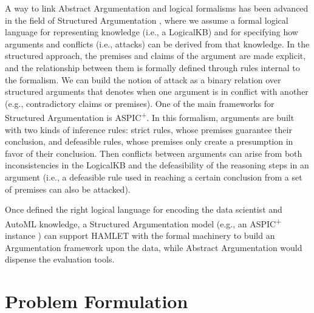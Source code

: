 A way to link Abstract Argumentation and logical formalisms has been advanced in the field of Structured Argumentation \cite{BesnardGHMPST14structured}, where we assume a formal logical language for representing knowledge (i.e., a LogicalKB) and for specifying how arguments and conflicts (i.e., attacks) can be derived from that knowledge. 
In the structured approach, the premises and claims of the argument are made explicit, and the relationship between them is formally defined through rules internal to the formalism.
We can build the notion of attack as a binary relation over structured arguments that denotes when one argument is in conflict with another (e.g., contradictory claims or premises).
One of the main frameworks for Structured Argumentation is ASPIC\textsuperscript{+}\cite{Modgil2014aspic+}.
In this formalism, arguments are built with two kinds of inference rules: strict rules, whose premises guarantee their conclusion, and defeasible rules, whose premises only create a presumption in favor of their conclusion.
Then conflicts between arguments can arise from both inconsistencies in the LogicalKB and the defeasibility of the reasoning steps in an argument (i.e., a defeasible rule used in reaching a certain conclusion from a set of premises can also be attacked).

Once defined the right logical language for encoding the data scientist and AutoML knowledge, a Structured Argumentation model (e.g., an ASPIC\textsuperscript{+} instance \cite{arg2p-jlc}) can support HAMLET with the formal machinery to build an Argumentation framework upon the data, while Abstract Argumentation would dispense the evaluation tools.

\section{Problem Formulation}\label{hamlet-sec:problem}

